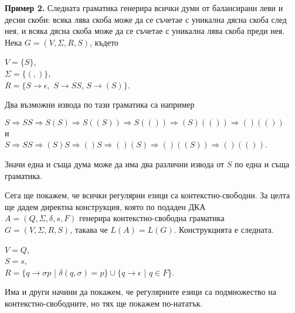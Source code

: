 \documentclass{article}
\begin{document}
    \textbf{Пример 2.} Следната граматика генерира всички думи от балансирани леви
    и десни скоби: всяка лява скоба може да се съчетае с уникална дясна скоба след нея,
    и всяка дясна скоба може да се съчетае с уникална лява скоба преди нея. Нека 
    $G = (V,\Sigma,R,S)$, където
    \begin{center}
        $V = \{S\}$, \\
        $\Sigma = \{(,)\}$, \\
        $R = \{S \rightarrow \epsilon,$ $S \rightarrow SS$, $S\rightarrow (S)\}$.
    \end{center}

    Два възможни извода по тази граматика са например
    \begin{center}
        $S \Rightarrow SS \Rightarrow S(S) \Rightarrow S((S)) \Rightarrow S(()) \Rightarrow (S)(()) \Rightarrow ()(())$ \\
        \vspace{5pt}
        и \\
        \vspace{5pt}
        $S \Rightarrow SS \Rightarrow (S)S \Rightarrow ()S \Rightarrow ()(S) \Rightarrow ()((S)) \Rightarrow ()(())$.
    \end{center}
    Значи една и съща дума може да има два различни извода от $S$ по една и съща граматика.

    \vspace{15pt}

    \hspace{15pt}Сега ще покажем, че всички регулярни езици са контекстно-свободни. За целта ще дадем
    директна конструкция, която по подаден ДКА \\ $A = (Q,\Sigma,\delta,s,F)$ генерира контекстно-свободна граматика \\
    $G=(V,\Sigma,R,S)$, такава че $L(A) = L(G)$. Конструкцията е следната.
    \begin{center}
        $V = Q$, \\
        $S = s$, \\
        $R = \{q \rightarrow \sigma p$ | $\delta(q,\sigma) = p\} \cup \{q \rightarrow \epsilon$ | $q \in F$\}.
    \end{center}

    Има и други начини да покажем, че регулярните езици са подмножество
    на контекстно-свободните, но тях ще покажем по-нататък.


\vspace{25pt}
\end{document}
